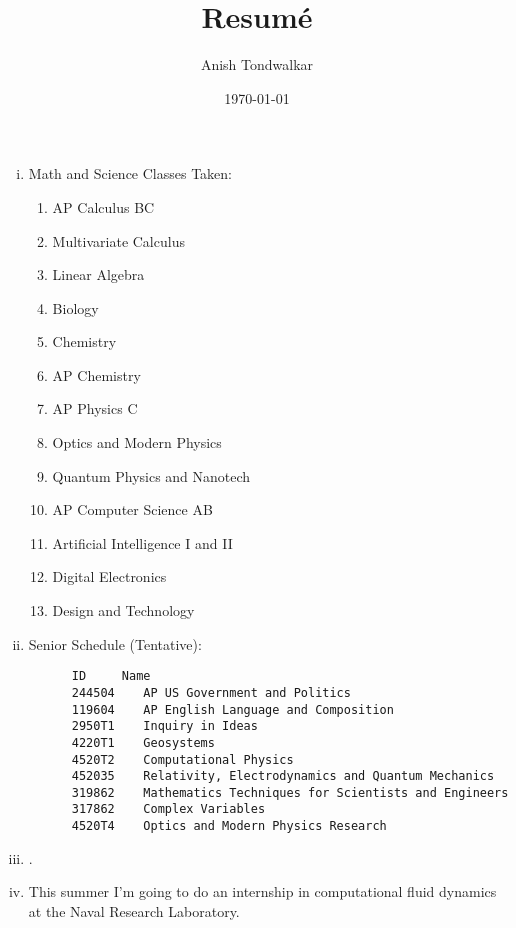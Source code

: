 \documentclass[11pt,notitlepage]{article}
\title{Resum\'e}
\author{Anish Tondwalkar}
\date{\today}
\begin{document}
\maketitle
\begin{enumerate}[i)]
  \item Math and Science Classes Taken: 
    \begin{enumerate}
    \item AP Calculus BC
    \item Multivariate Calculus
    \item Linear Algebra
    \item Biology
    \item Chemistry
    \item AP Chemistry
    \item AP Physics C
    \item Optics and Modern Physics
    \item Quantum Physics and Nanotech
    \item AP Computer Science AB
    \item Artificial Intelligence I and II
    \item Digital Electronics
    \item Design and Technology  
  \end{enumerate}
  \item Senior Schedule (Tentative): 
\begin{verbatim}
      ID     Name	
      244504	AP US Government and Politics
      119604	AP English Language and Composition
      2950T1	Inquiry in Ideas
      4220T1	Geosystems
      4520T2	Computational Physics
      452035	Relativity, Electrodynamics and Quantum Mechanics
      319862	Mathematics Techniques for Scientists and Engineers
      317862	Complex Variables
      4520T4	Optics and Modern Physics Research
\end{verbatim}
  \item 
    	.
 \item This summer I'm going to do an internship in computational fluid dynamics at the Naval Research Laboratory. 
\end{enumerate}
\end{document}
